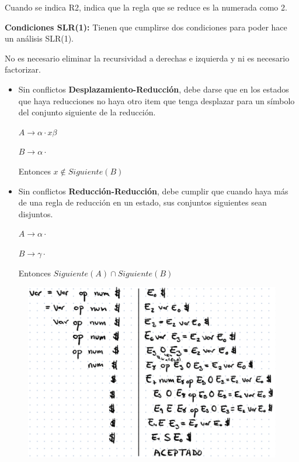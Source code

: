 \documentclass[12pt, twoside, openright]{report} %
\begin{document}
Cuando se indica R2, indica que la regla que se reduce es la numerada como 2.

\textbf{Condiciones SLR(1):}
Tienen que cumplirse dos condiciones para poder hace un análisis SLR(1). 

No es necesario eliminar la recursividad a derechas e izquierda y ni es necesario factorizar.

\begin{itemize}
  \item Sin conflictos \textbf{Desplazamiento-Reducción}, debe darse que en los estados que haya reducciones no haya otro item que tenga desplazar para un símbolo del conjunto siguiente de la reducción.
  
  $A \rightarrow \alpha \cdot x \beta$

  $B \rightarrow \alpha \cdot$

  Entonces $x \notin Siguiente(B)$

  \item Sin conflictos \textbf{Reducción-Reducción}, debe cumplir que cuando haya más de una regla de reducción en un estado, sus conjuntos siguientes sean disjuntos.
    
  $A \rightarrow \alpha \cdot $

  $B \rightarrow \gamma \cdot$

  Entonces $Siguiente(A) \cap Siguiente(B)$
\end{itemize}



\begin{figure}[H]
  {\includegraphics[scale=.5]{2021-04-13 14_59_35-ASintactico.pdf - Foxit Reader.png}}
\end{figure}
\end{document}
